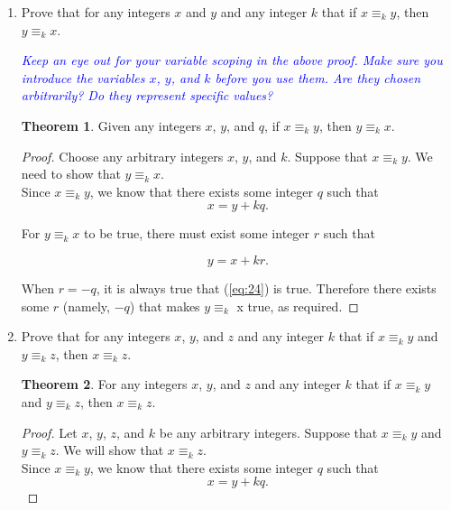 \documentclass{article}
\renewcommand{\(}{\left(}
\renewcommand{\)}{\right)}
\theoremstyle{plain}
\theoremstyle{plain}
\theoremstyle{definition}
\newtheorem{theorem}{Theorem}[section]
\begin{document}
\begin{enumerate}[label*=\roman*.,ref=\roman*]
\begin{shaded}
\begin{proof}
	Since we have achieved an absurdity, it must be the case that $x \equiv_k x$, since there exists a $q$ (namely, $q = 0$) such that $x = x + kq$.
\end{proof}
\end{shaded}

\item Prove that for any integers $x$ and $y$ and any integer $k$ that if $x \equiv_k y$, then $y \equiv_k x$.

\textit{\textcolor{blue}{Keep an eye out for your variable scoping in the above proof. Make sure you introduce the variables $x$, $y$, and $k$ before you use them. Are they chosen arbitrarily? Do they represent specific values?}}

\begin{shaded}
\begin{theorem}
	Given any integers $x$, $y$, and $q$, if $x \equiv_k y$, then $y \equiv_k x$.
\end{theorem}
\begin{proof}
	Choose any arbitrary integers $x$, $y$, and $k$. Suppose that $x \equiv_k y$. We need to show that $y \equiv_k x$. \\

	Since $x \equiv_k y$, we know that there exists some integer $q$ such that
	\begin{equation}
	x = y + kq.
	\end{equation}

	For $y \equiv_k x$ to be true, there must exist some integer $r$ such that

	\begin{equation} \label{eq:24}
	y = x + kr.
	\end{equation}
	
	When $r = -q$, it is always true that (\ref{eq:24}) is true. Therefore there exists some $r$ (namely, $-q$) that makes $y \equiv_k$ x true, as required.
\end{proof}
\end{shaded}

\item Prove that for any integers $x$, $y$, and $z$ and any integer $k$ that if $x \equiv_k y$ and $y \equiv_k z$, then $x \equiv_k z$.

\begin{shaded}
\begin{theorem}
	For any integers $x$, $y$, and $z$ and any integer $k$ that if $x \equiv_k y$ and $y \equiv_k z$, then $x \equiv_k z$.
\end{theorem}
\begin{proof}
	Let $x$, $y$, $z$, and $k$ be any arbitrary integers. Suppose that $x \equiv_k y$ and $y \equiv_k z$. We will show that $x \equiv_k z$. \\
	Since  $x \equiv_k y$, we know that there exists some integer $q$ such that 
	\begin{equation} \label{eq:25}
	x = y + kq.
	\end{equation}
	

\end{proof}
\end{shaded}
\end{enumerate}
\end{document}
